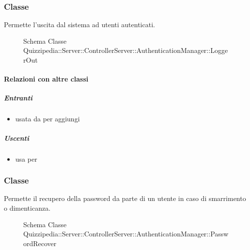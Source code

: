 \subsubsection{Classe }
Permette l'uscita dal sistema ad utenti autenticati.
\begin{figure}[H]
\centering
\noindent{}
\caption[Schema Classe LoggerOut]{Schema Classe Quizzipedia::Server::ControllerServer::AuthenticationManager::LoggerOut}
\end{figure}
\paragraph{Relazioni con altre classi}
\subparagraph{Entranti}
\begin{itemize}
\item usata da  per aggiungi
\end{itemize}
\subparagraph{Uscenti}
\begin{itemize}
\item usa  per 
\end{itemize}
\subsubsection{Classe }
Permette il recupero della password da parte di un utente in caso di smarrimento o dimenticanza.
\begin{figure}[H]
\centering
\noindent{}
\caption[Schema Classe PasswordRecover]{Schema Classe Quizzipedia::Server::ControllerServer::AuthenticationManager::PasswordRecover}
\end{figure}
